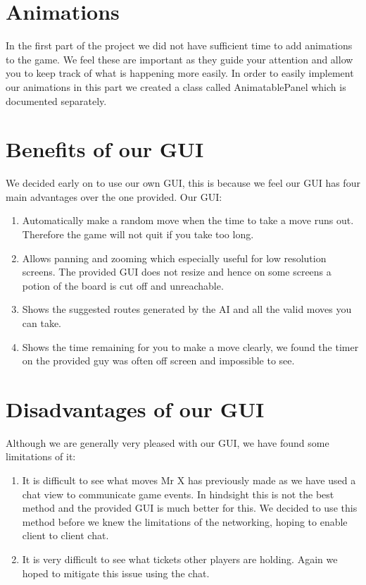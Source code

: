 \documentclass[a4paper, 12pt]{article}
\begin{document}
\section{Animations}
In the first part of the project we did not have sufficient time to add animations to the game. We feel these are important as they guide your attention and allow you to keep track of what is happening more easily. In order to easily implement our animations in this part we created a class called AnimatablePanel which is documented separately.
\section{Benefits of our GUI}
We decided early on to use our own GUI, this is because we feel our GUI has four main advantages over the one provided. Our GUI:
\begin{enumerate}
	\item Automatically make a random move when the time to take a move runs out. Therefore the game will not quit if you take too long.
	\item Allows panning and zooming which especially useful for low resolution screens. The provided GUI does not resize and hence on some screens a potion of the board is cut off and unreachable.
	\item Shows the suggested routes generated by the AI and all the valid moves you can take.
	\item Shows the time remaining for you to make a move clearly, we found the timer on the provided guy was often off screen and impossible to see.
\end{enumerate}
\section{Disadvantages of our GUI}
Although we are generally very pleased with our GUI, we have found some limitations of it:
\begin{enumerate}
	\item It is difficult to see what moves Mr X has previously made as we have used a chat view to communicate game events. In hindsight this is not the best method and the provided GUI is much better for this. We decided to use this method before we knew the limitations of the networking, hoping to enable client to client chat.
	\item It is very difficult to see what tickets other players are holding. Again we hoped to mitigate this issue using the chat.
\end{enumerate}
\end{document}
